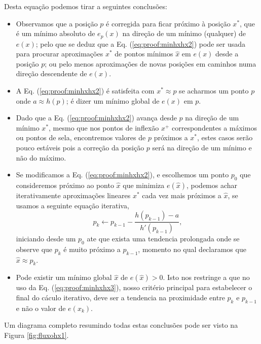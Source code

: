 \begin{myproofT}
Desta equação podemos tirar a seguintes conclusões:
\begin{itemize}

\item Observamos que a posição $p$ é corregida para ficar próximo à posição $x^*$, 
que é um mínimo absoluto de $e_p(x)$ na direção de um mínimo (qualquer) de $e(x)$;
pelo que se deduz que a Eq. (\ref{eq:proof:minhxhx2})
pode ser usada para procurar aproximações $x^*$ de pontos mínimos $\hat{x}$ em $e(x)$ desde a posição $p$;
ou pelo menos aproximações de novas posições em caminhos numa direção descendente de $e(x)$.

\item A Eq. (\ref{eq:proof:minhxhx2}) é satisfeita 
com $x^* \approx p$ se acharmos um  
ponto $p$ onde  $a \approx h(p)$; 
é dizer um mínimo global de $e(x)$ em $p$.%

\item Dado que a Eq. (\ref{eq:proof:minhxhx2}) avança desde $p$ na direção de um mínimo $x^*$, 
mesmo que nos pontos de inflexão $x^+$ correspondentes a máximos ou pontos de sela,
encontremos valores de $p$ próximos a $x^*$,
 estes casos serão pouco estáveis pois
a correção da posição $p$ será na direção de um mínimo e não do máximo.

\item Se modificamos a Eq. (\ref{eq:proof:minhxhx2}), e escolhemos um ponto  
$p_0$ que consideremos próximo ao ponto $\hat{x}$ que minimiza $e(\hat{x})$,
podemos achar iterativamente aproximações lineares $x^*$ cada vez mais próximos a  $\hat{x}$,
se usamos a seguinte equação iterativa,
\begin{equation}\label{eq:proof:minhxhx3}
p_{k} \leftarrow p_{k-1} - \frac{ h(p_{k-1})-a}{h'(p_{k-1})},
\end{equation}
iniciando desde um $p_{0}$ 
ate que exista uma tendencia prolongada onde se observe que $p_{k}$ é muito próximo a $p_{k-1}$,
momento no qual declaramos que $\hat{x} \approx p_{k}$.
\item Pode existir um mínimo global $\hat{x}$ de $e(\hat{x})>0$.
Isto nos restringe a que no uso da Eq. (\ref{eq:proof:minhxhx3}),
nosso critério principal para estabelecer o final do cáculo iterativo,
deve ser a tendencia na  proximidade entre $p_{k}$ e $p_{k-1}$ 
e não o valor de $e(x_k)$.
\end{itemize}

Um diagrama completo resumindo todas estas conclusões pode ser visto na Figura \ref{fig:fluxohx1}.
\end{myproofT}



